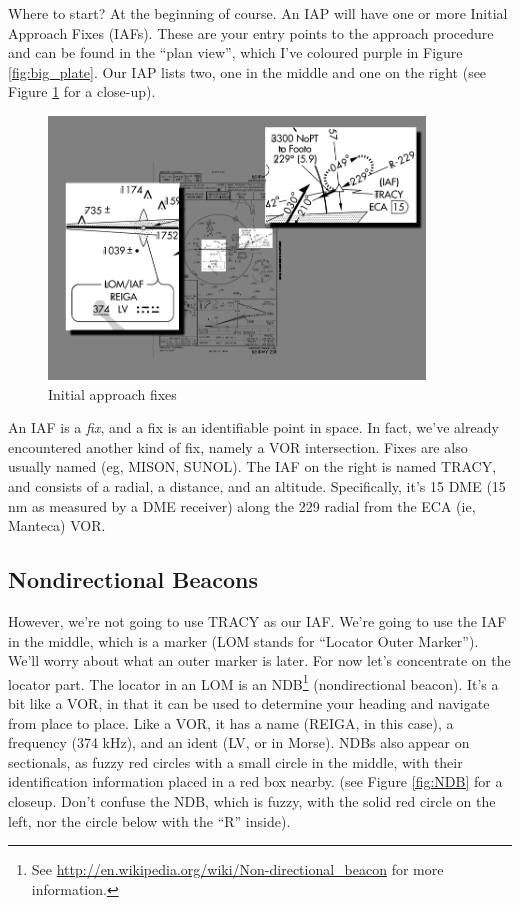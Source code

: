 Where to start?  At the beginning of course.  An IAP will have one or
more Initial Approach Fixes (IAFs).  These are your entry points to
the approach procedure and can be found in the ``plan view'', which
I've coloured purple in Figure \ref{fig:big_plate}.  Our IAP lists
two, one in the middle and one on the right (see Figure \ref{fig:IAFs}
for a close-up).

\begin{figure}
  \begin{center}
    \includegraphics[width=10cm]{img/IAFs}
    \caption{Initial approach fixes}
    \label{fig:IAFs}
  \end{center}
\end{figure}


An IAF is a \emph{fix}, and a fix is an identifiable point in space.
In fact, we've already encountered another kind of fix, namely a VOR
intersection.  Fixes are also usually named (eg, MISON, SUNOL).  The
IAF on the right is named TRACY, and consists of a radial, a distance,
and an altitude.  Specifically, it's 15 DME (15 nm as measured by a
DME receiver) along the 229 radial from the ECA (ie, Manteca) VOR.

\subsection{Nondirectional Beacons}

However, we're not going to use TRACY as our IAF.  We're going to use
the IAF in the middle, which is a marker (LOM stands for ``Locator
Outer Marker'').  We'll worry about what an outer marker is later.
For now let's concentrate on the locator part.  The locator in an LOM
is an NDB\footnote{See
  \url{http://en.wikipedia.org/wiki/Non-directional_beacon} for more
  information.} (nondirectional beacon).  It's a bit like a VOR, in
that it can be used to determine your heading and navigate from place
to place.  Like a VOR, it has a name (REIGA, in this case), a
frequency (374 kHz), and an ident (LV, or
{\mdot\mdash\mdot\mdot\mspace \mdot\mdot\mdot\mdash} in Morse).  NDBs
also appear on sectionals, as fuzzy red circles with a small circle in
the middle, with their identification information placed in a red box
nearby. (see Figure \ref{fig:NDB} for a closeup.  Don't confuse the
NDB, which is fuzzy, with the solid red circle on the left, nor the
circle below with the ``R'' inside).

